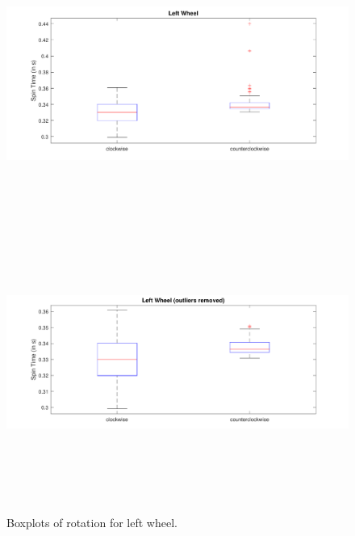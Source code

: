 \documentclass[a4paper,twoside]{book}
\begin{document}
\begin{figure}[h]
 
\includegraphics[width=\paperwidth, height=9cm, center]{img/left} 
\includegraphics[width=\paperwidth, height=9cm, center]{img/left2}
\caption{Boxplots of rotation for left wheel.}

\end{figure}
\end{document}
